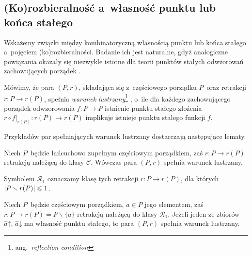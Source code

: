 


\subsection{(Ko)rozbieralność a~własność punktu lub końca stałego}\label{subsec-korozb_a_wl_FPEP}
Wskażemy związki między kombinatoryczną własnością punktu lub końca stałego a~pojęciem (ko)rozbieralności. Badanie ich jest naturalne, gdyż analogiczne powiązania okazały się niezwykle istotne dla teorii punktów stałych odwzorowań zachowujących porządek \cite{Schroder99,Schroder03,Schroder12}.

Mówimy, że para $(P,r)$, składająca się z~częściowego porządku $P$~oraz retrakcji $r\colon P\to r(P)$, spełnia \textit{warunek lustrzany}\footnote{ang.~\textit{reflection condition}} \cite[Definition 3.17]{Schroder99}, o~ile dla każdego zachowującego porządek odwzorowania $f\colon P\to P$ istnienie punktu stałego złożenia $r\circ f\big|_{r(P)}\colon r(P)\to r(P)$ implikuje istnieje punktu stałego funkcji $f$.

Przykładów par spełniających warunek lustrzany dostarczają następujące lematy.

\begin{lem}\label{lem-schrodera_o_warunku_lustrzanym_dla_C}
Niech $P$~będzie łańcuchowo zupełnym częściowym porządkiem, zaś $r\colon P\to r(P)$ retrakcją należącą do klasy $\mathcal{C}$. Wówczas para $(P,r)$ spełnia warunek lustrzany.
\end{lem}
Symbolem $\mathcal{R}_1$ \cite[Example 3.8]{Schroder99} oznaczamy klasę tych retrakcji $r\colon P\to r(P)$, dla których $\left|P\smallsetminus r(P)\right|\leqslant 1$.
\begin{lem}\label{lem-schrodera_o_warunku_lustrzanym_dla_R1}
Niech $P$~będzie częściowym porządkiem, $a\in P$ jego elementem, zaś $r\colon P\to r(P)=P\smallsetminus\{a\}$ retrakcją należącą do klasy $\mathcal{R}_1$. Jeżeli jeden ze zbiorów $\hat{a}\mathord{\uparrow}$, $\hat{a}\mathord{\downarrow}$ ma własność punktu stałego, to para $(P,r)$ spełnia warunek lustrzany.
\end{lem}

